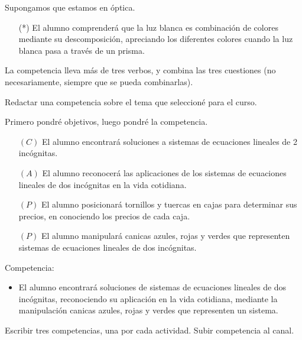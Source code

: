 \documentclass[12pt]{report}
\theoremstyle{largebreak}
\begin{document}
    Supongamos que estamos en óptica.

    \begin{itemize}
        \item[(*)] El alumno comprenderá que la luz blanca es combinación de colores mediante su descomposición, apreciando los diferentes colores cuando la luz blanca pasa a través de un prisma.
    \end{itemize}

    La competencia lleva más de tres verbos, y combina las tres cuestiones (no necesariamente, siempre que se pueda combinarlas).

    \begin{excer}
        Redactar una competencia sobre el tema que seleccioné para el curso.
    \end{excer}

    Primero pondré objetivos, luego pondré la competencia.

    \begin{itemize}
        \item[$(C)$] El alumno encontrará soluciones a sistemas de ecuaciones lineales de 2 incógnitas.
        \item[$(A)$] El alumno reconocerá las aplicaciones de los sistemas de ecuaciones lineales de dos incógnitas en la vida cotidiana.
        \item[$(P)$] El alumno posicionará tornillos y tuercas en cajas para determinar sus precios, en conociendo los precios de cada caja.
        \item[$(P)$] El alumno manipulará canicas azules, rojas y verdes que representen sistemas de ecuaciones lineales de dos incógnitas.
    \end{itemize}

    Competencia:

    \begin{itemize}
        \item El alumno encontrará soluciones de sistemas de ecuaciones lineales de dos incógnitas, reconociendo su aplicación en la vida cotidiana, mediante la manipulación canicas azules, rojas y verdes que representen un sistema.
    \end{itemize}

    \begin{excer}
        Escribir tres competencias, una por cada actividad. Subir competencia al canal.
    \end{excer}
\end{document}
